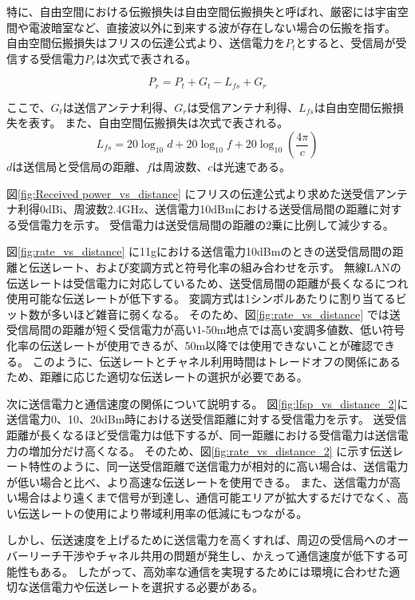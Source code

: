 \documentclass[a4paper,10.5pt]{ltjsarticle}
\begin{document}
特に、自由空間における伝搬損失は自由空間伝搬損失と呼ばれ、厳密には宇宙空間や電波暗室など、直接波以外に到来する波が存在しない場合の伝搬を指す。
自由空間伝搬損失はフリスの伝達公式より、送信電力を$P_t$とすると、受信局が受信する受信電力$P_r$は次式で表される。


\begin{equation}
  P_r = P_t + G_t - L_{fs} + G_r 
  \label{eq:friis}
\end{equation}
\noindent

ここで、$G_t$は送信アンテナ利得、$G_r$は受信アンテナ利得、$L_{fs}$は自由空間伝搬損失を表す。
また、自由空間伝搬損失は次式で表される。
\begin{equation}
  L_{fs} = 20\log_{10}d + 20\log_{10}f + 20\log_{10}(\frac{4\pi}{c})
  \label{eq:lfsp}
\end{equation}
\noindent 
$d$は送信局と受信局の距離、$f$は周波数、$c$は光速である。

図\ref{fig:Received power_vs_distance} にフリスの伝達公式より求めた送受信アンテナ利得0dBi、周波数2.4GHz、送信電力10dBmにおける送受信局間の距離に対する受信電力を示す。
受信電力は送受信局間の距離の2乗に比例して減少する。

図\ref{fig:rate_vs_distance} に11gにおける送信電力10dBmのときの送受信局間の距離と伝送レート、および変調方式と符号化率の組み合わせを示す。
無線LANの伝送レートは受信電力に対応しているため、送受信局間の距離が長くなるにつれ使用可能な伝送レートが低下する。
変調方式は1シンボルあたりに割り当てるビット数が多いほど雑音に弱くなる。
そのため、図\ref{fig:rate_vs_distance} では送受信局間の距離が短く受信電力が高い1-50m地点では高い変調多値数、低い符号化率の伝送レートが使用できるが、50m以降では使用できないことが確認できる。
このように、伝送レートとチャネル利用時間はトレードオフの関係にあるため、距離に応じた適切な伝送レートの選択が必要である。

次に送信電力と通信速度の関係について説明する。
図\ref{fig:lfsp_vs_distance_2}に送信電力0、10、20dBm時における送受信距離に対する受信電力を示す。
送受信距離が長くなるほど受信電力は低下するが、同一距離における受信電力は送信電力の増加分だけ高くなる。
そのため、図\ref{fig:rate_vs_distance_2} に示す伝送レート特性のように、同一送受信距離で送信電力が相対的に高い場合は、送信電力が低い場合と比べ、より高速な伝送レートを使用できる。
また、送信電力が高い場合はより遠くまで信号が到達し、通信可能エリアが拡大するだけでなく、高い伝送レートの使用により帯域利用率の低減にもつながる。

しかし、伝送速度を上げるために送信電力を高くすれば、周辺の受信局へのオーバーリーチ干渉やチャネル共用の問題が発生し、かえって通信速度が低下する可能性もある。
したがって、高効率な通信を実現するためには環境に合わせた適切な送信電力や伝送レートを選択する必要がある。
\end{document}
